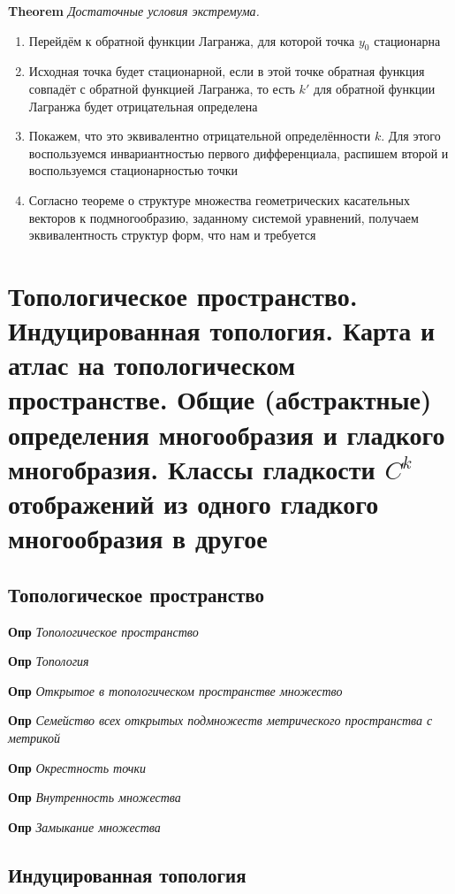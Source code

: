 \documentclass[a4paper, 14pt]{article}
\begin{document}
    \textbf{Theorem} \textit{Достаточные условия экстремума.}
    
    \begin{enumerate}
        \item Перейдём к обратной функции Лагранжа, для которой точка $y_0$ стационарна
        \item Исходная точка будет стационарной, если в этой точке обратная функция совпадёт с обратной функцией
        Лагранжа, то есть $k'$ для обратной функции Лагранжа будет отрицательная определена
        \item Покажем, что это эквивалентно отрицательной определённости $k$.
        Для этого воспользуемся инвариантностью первого дифференциала, распишем второй и воспользуемся
        стационарностью точки
        \item Согласно теореме о структуре множества геометрических касательных векторов к подмногообразию, заданному
        системой уравнений, получаем эквивалентность структур форм, что нам и требуется
    \end{enumerate}
    
    \section{Топологическое пространство.
    Индуцированная топология.
    Карта и атлас на топологическом пространстве.
    Общие (абстрактные) определения многообразия и гладкого многобразия.
    Классы гладкости $C^k$ отображений из одного гладкого многообразия в другое}
    
    \subsection{Топологическое пространство}
    
    \textbf{Опр} \textit{Топологическое пространство}
    
    \textbf{Опр} \textit{Топология}
    
    \textbf{Опр} \textit{Открытое в топологическом пространстве множество}
    
    \textbf{Опр} \textit{Семейство всех открытых подмножеств метрического пространства с метрикой}
    
    \textbf{Опр} \textit{Окрестность точки}
    
    \textbf{Опр} \textit{Внутренность множества}
    
    \textbf{Опр} \textit{Замыкание множества}
    
    \subsection{Индуцированная топология}
    
\end{document}
